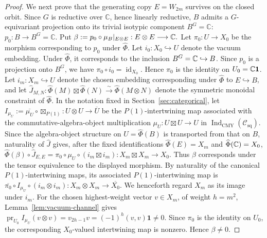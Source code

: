 \documentclass[10pt,a4paper]{amsart}
\numberwithin{equation}{section} \newtheorem{thm}{Theorem}[section] \newtheorem{lem}[thm]{Lemma} \newtheorem{ex}[thm]{Example} \newtheorem{prop}[thm]{Proposition} \newtheorem{cor}[thm]{Corollary} \newtheorem{defi}[thm]{Definition} \newtheorem{rmk}[thm]{Remark} \newtheorem{notation}[thm]{Notation}
\newcommand{\one}{\mathbf{1}}
\newcommand{\id}{\operatorname{id}}
\newcommand{\Csq}{\mathcal C_{\mathrm{sq}}}
\newcommand{\IndCMY}{\operatorname{Ind}_{\mathrm{CMY}}}
\begin{document}
\begin{proof}
We next prove that the generating copy $E=W_{2m}$ survives on the closed orbit. Since $G$ is reductive over $\mathbb C$, hence linearly reductive, $B$ admits a $G$-equivariant projection onto its trivial isotypic component $B^G=\mathbb C$: $p_0:B\longrightarrow B^G=\mathbb C.$ Put \(\beta:=p_0\circ\mu_B|_{E\otimes E}:E\otimes E\longrightarrow\mathbb{C}.\) Let $\pi_0:U\to X_0$ be the morphism corresponding to $p_0$ under $\widehat\Phi$. Let $i_0:X_0\hookrightarrow U$ denote the vacuum embedding. Under $\widehat\Phi$, it corresponds to the inclusion $B^G=\mathbb{C}\hookrightarrow B$. Since $p_0$ is a projection onto $B^G$, we have $\pi_0\circ i_0=\id_{X_0}.$ Hence $\pi_0$ is the identity on $U_0=\C\one$. Let $i_m:X_m\hookrightarrow U$ denote the chosen embedding corresponding under $\widehat\Phi$ to $E\hookrightarrow B$, and let \(\widehat J_{M,N}:\widehat\Phi(M)\boxtimes\widehat\Phi(N) \overset\sim\longrightarrow\widehat\Phi(M\otimes N)\) denote the symmetric monoidal constraint of $\widehat\Phi$. In the notation fixed in Section~\ref{sec:categorical}, let \(I_{\mu_U}:=\overline{\mu_U}\circ\boxtimes_{P(1)}:U\otimes U\to\overline U\) be the $P(1)$-intertwining map associated with the commutative-algebra-object multiplication $\mu_U:U\boxtimes U\to U$ in $\IndCMY(\Csq)$. Since the algebra-object structure on $U=\widehat\Phi(B)$ is transported from that on $B$, naturality of $\widehat J$ gives, after the fixed identifications $\widehat\Phi(E)=X_m$ and $\widehat\Phi(\mathbb{C})=X_0$, \(\widehat\Phi(\beta)\circ\widehat J_{E,E} =\pi_0\circ\mu_U\circ(i_m\boxtimes i_m): X_m\boxtimes X_m\longrightarrow X_0\). Thus $\beta$ corresponds under the tensor equivalence to the displayed morphism. By naturality of the canonical $P(1)$-intertwining maps, its associated $P(1)$-intertwining map is \(\overline{\pi_0}\circ I_{\mu_U}\circ(i_m\otimes i_m): X_m\otimes X_m\longrightarrow\overline{X_0}\). We henceforth regard $X_m$ as its image under $i_m$. For the chosen highest-weight vector $v\in X_m$, of weight $h=m^2$, Lemma~\ref{lem:vacuum-channel} gives \(\operatorname{pr}_{U_0}I_{\mu_U}(v\otimes v)=v_{2h-1}v=(-1)^h(v,v)\one\ne0.\) Since $\pi_0$ is the identity on $U_0$, the corresponding $X_0$-valued intertwining map is nonzero. Hence $\beta\ne0$.


\end{proof}
\end{document}
